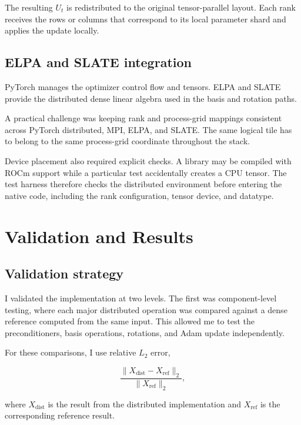 \documentclass[11pt]{article}
\begin{document}
The resulting $U_t$ is redistributed to the original tensor-parallel layout. Each rank receives the rows or columns that correspond to its local parameter shard and applies the update locally.

\subsection{ELPA and SLATE integration}

PyTorch manages the optimizer control flow and tensors. ELPA and SLATE provide the distributed dense linear algebra used in the basis and rotation paths.

A practical challenge was keeping rank and process-grid mappings consistent across PyTorch distributed, MPI, ELPA, and SLATE. The same logical tile has to belong to the same process-grid coordinate throughout the stack.

Device placement also required explicit checks. A library may be compiled with ROCm support while a particular test accidentally creates a CPU tensor. The test harness therefore checks the distributed environment before entering the native code, including the rank configuration, tensor device, and datatype.


\section{Validation and Results}

\subsection{Validation strategy}

I validated the implementation at two levels. The first was component-level testing, where each major distributed operation was compared against a dense reference computed from the same input. This allowed me to test the preconditioners, basis operations, rotations, and Adam update independently.

For these comparisons, I use relative $L_2$ error,

\begin{equation}
\frac{\lVert X_{\mathrm{dist}} - X_{\mathrm{ref}}\rVert_2}
     {\lVert X_{\mathrm{ref}}\rVert_2},
\end{equation}

where $X_{\mathrm{dist}}$ is the result from the distributed implementation and $X_{\mathrm{ref}}$ is the corresponding reference result.
\end{document}
